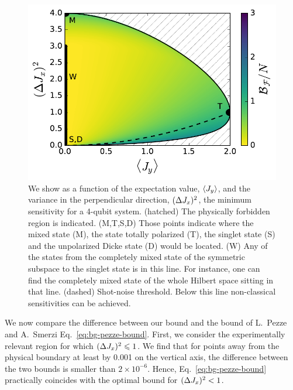 \begin{figure}[htp]
  \centering
  \includegraphics[scale=.65]{img/plots/LT_spsq2d_4.pdf}
  \caption[Solution for 4 particle on the paramenter region for spin-squeezed states.]{We show as a function of the expectation value, $\langle{J_y}\rangle$, and the variance in the perpendicular direction, $(\Delta J_x )^2$, the minimum sensitivity for a 4-qubit system.
  (hatched) The physically forbidden region is indicated. (M,T,S,D) Those points indicate where the mixed state (M), the state totally polarized (T), the singlet state (S) and the unpolarized Dicke state (D) would be located. (W) Any of the states from the completely mixed state of the symmetric subspace to the singlet state is in this line. For instance, one can  find the completely mixed state of the whole Hilbert space sitting in that line. (dashed) Shot-noise threshold. Below this line non-classical sensitivities can be achieved.}
  \label{fig:lt-spsq2d-4}
\end{figure}

We now compare the difference between our bound and the bound of L.~Pezze and A.~Smerzi Eq.~\eqref{eq:bg-pezze-bound}.
First, we consider the experimentally relevant region for which $(\Delta J_x )^2\leqslant 1$.
We find that for points away from the physical boundary at least by 0.001 on the vertical axis, the difference between the two bounds is smaller than $2\times10^{-6}$.
Hence, Eq.~\eqref{eq:bg-pezze-bound} practically coincides with the optimal bound for $(\Delta J_x )^2<1$.

